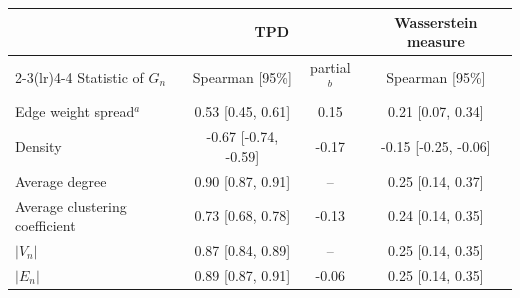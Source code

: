 \begin{tabular}{@{}lccc@{}}
\toprule
 & \multicolumn{2}{c}{TPD} & Wasserstein measure\\
\cmidrule(lr){2-3}\cmidrule(lr){4-4}
Statistic of $G_n$ & Spearman [95\%] & partial$^{b}$ & Spearman [95\%]\\
\midrule
Edge weight spread$^{a}$ & 0.53 [0.45, 0.61] & 0.15 & 0.21 [0.07, 0.34]\\
Density & -0.67 [-0.74, -0.59] & -0.17 & -0.15 [-0.25, -0.06]\\
Average degree & 0.90 [0.87, 0.91] & -- & 0.25 [0.14, 0.37]\\
Average clustering coefficient & 0.73 [0.68, 0.78] & -0.13 & 0.24 [0.14, 0.35]\\
$|V_n|$ & 0.87 [0.84, 0.89] & -- & 0.25 [0.14, 0.35]\\
$|E_n|$ & 0.89 [0.87, 0.91] & -0.06 & 0.25 [0.14, 0.35]\\
\bottomrule
\end{tabular}
